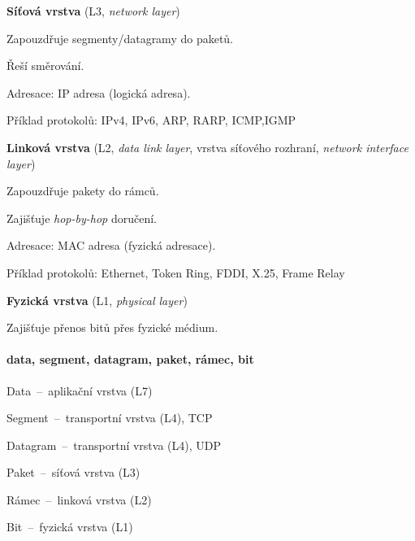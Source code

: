 \begin{compactitem}
    \item \textbf{Síťová vrstva} (L3, \textit{network layer}) \begin{compactitem}
        \item Zapouzdřuje segmenty/datagramy do paketů.
        \item Řeší směrování.
        \item Adresace: IP adresa (logická adresa).
        \item Příklad protokolů: IPv4, IPv6, ARP, RARP, ICMP,IGMP
    \end{compactitem}

    \item \textbf{Linková vrstva} (L2, \textit{data link layer}, vrstva síťového rozhraní, \textit{network interface layer}) \begin{compactitem}
        \item Zapouzdřuje pakety do rámců.
        \item Zajišťuje \textit{hop-by-hop} doručení.
        \item Adresace: MAC adresa (fyzická adresace).
        \item Příklad protokolů: Ethernet, Token Ring, FDDI, X.25, Frame Relay
    \end{compactitem}

    \item \textbf{Fyzická vrstva} (L1, \textit{physical layer}) \begin{compactitem}
        \item Zajišťuje přenos bitů přes fyzické médium.
    \end{compactitem}

\end{compactitem}

\paragraph*{data, segment, datagram, paket, rámec, bit} \begin{compactitem}
    \item Data~--~aplikační vrstva (L7)
    \item Segment~--~transportní vrstva (L4), TCP
    \item Datagram~--~transportní vrstva (L4), UDP
    \item Paket~--~síťová vrstva (L3)
    \item Rámec~--~linková vrstva (L2)
    \item Bit~--~fyzická vrstva (L1)
\end{compactitem}

